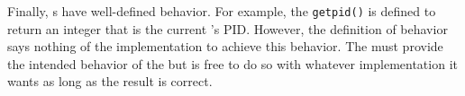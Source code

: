 Finally, s have well-defined behavior.
For example, the  \texttt{getpid()} is defined to return an integer that is the current ’s PID.\@
However, the definition of behavior says nothing of the implementation to achieve this behavior.
The  must provide the intended behavior of the  but is free to do so with whatever implementation it wants as long as the result is correct.










